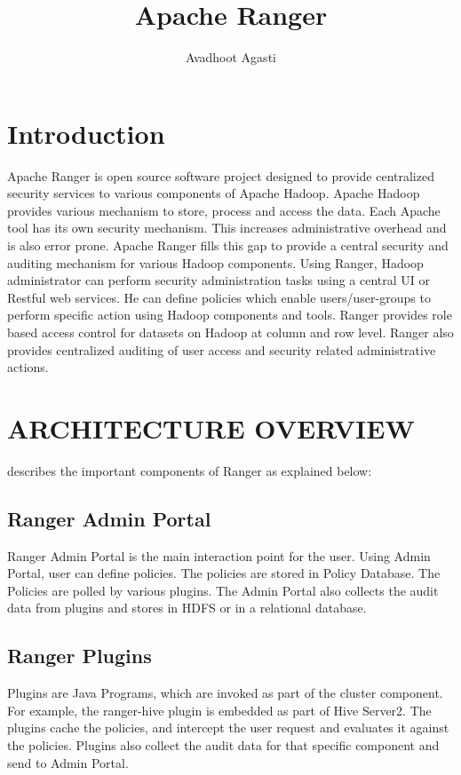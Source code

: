 \documentclass[9pt,twocolumn,twoside]{../../styles/osajnl}
\title{Apache Ranger}
\author[1,*, +]{Avadhoot Agasti}
\affil[1]{School of Informatics and Computing, Bloomington, IN 47408, U.S.A.}
\affil[*]{Corresponding authors: aagasti@indiana.edu}
\affil[+]{HID - SL-IO-3000}
\begin{document}
\maketitle

\section{Introduction}

Apache Ranger is open source software project designed to provide centralized
 security services to various components of Apache Hadoop. Apache Hadoop
 provides various mechanism to store, process and access the data. Each
 Apache tool has its own security mechanism. This increases administrative
 overhead and is also error prone. Apache Ranger fills this gap to provide
 a central security and auditing mechanism for various Hadoop components. Using
  Ranger, Hadoop administrator can perform security administration tasks
  using a central UI or Restful web services. He can define policies which
  enable users/user-groups to perform specific action using Hadoop components
   and tools. Ranger provides role based access control for datasets on
   Hadoop at column and row level. Ranger also provides centralized auditing
   of user access and security related administrative actions.

\section{ARCHITECTURE OVERVIEW}

\cite{www-ranger-architecture} describes the important components of Ranger as
 explained below:

\subsection{Ranger Admin Portal}

Ranger Admin Portal is the main interaction point for the user. Using Admin
Portal, user can define policies. The policies are stored in Policy Database.
 The Policies are polled by various plugins. The Admin Portal also collects
 the audit data from plugins and stores in HDFS or in a relational database.

\subsection{Ranger Plugins}

Plugins are Java Programs, which are invoked as part of the cluster component.
 For example, the ranger-hive plugin is embedded as part of Hive Server2. The
  plugins cache the policies, and intercept the user request and evaluates it
   against the policies. Plugins also collect the audit data for that
   specific component and send to Admin Portal.
\end{document}
